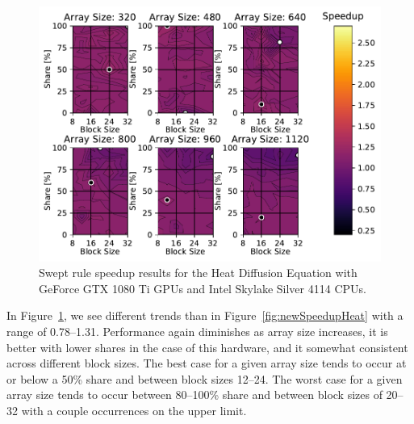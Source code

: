 \documentclass[mca,article,submit,moreauthors,pdftex]{Definitions/mdpi}
\def\oldCPU{Intel Skylake Silver 4114} %
\def\oldGPU{GeForce GTX 1080 Ti}
\begin{document}
\begin{figure}[htbp]
    \widefigure
    \includegraphics[scale=0.85]{figs/SpeedupTPTheatOld.pdf}
    \caption{Swept rule speedup results for the Heat Diffusion Equation with \oldGPU{} GPUs and \oldCPU{} CPUs.}
    \label{fig:oldSpeedupHeat} 
\end{figure}
\begin{paracol}{2}
\linenumbers
\switchcolumn

In Figure~\ref{fig:oldSpeedupHeat}, we see different trends than in Figure~\ref{fig:newSpeedupHeat} with a range of 0.78--1.31. 
Performance again diminishes as array size increases, it is better with lower shares in the case of this hardware, and it somewhat consistent across different block sizes. The best case for a given array size tends to occur at or below a 50\% share and between block sizes 12--24. 
The worst case for a given array size tends to occur between 80--100\% share and between block sizes of 20--32 with a couple occurrences on the upper limit.

\end{paracol}
\nointerlineskip
\end{document}
